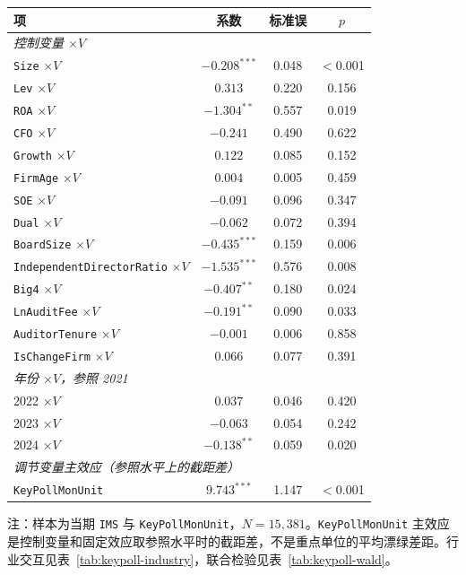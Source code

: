 \begin{center}
\begin{threeparttable}
\caption{完全交互的其他项：控制变量与年份}
\label{tab:keypoll-other}
\begin{tabular}{lccc}
\toprule
项 & 系数 & 标准误 & \(p\) \\
\midrule
\multicolumn{4}{l}{\textit{控制变量 $\times V$}} \\
\texttt{Size} $\times V$ & $-0.208^{***}$ & 0.048 & $<$0.001 \\
\texttt{Lev} $\times V$ & $0.313$ & 0.220 & 0.156 \\
\texttt{ROA} $\times V$ & $-1.304^{**}$ & 0.557 & 0.019 \\
\texttt{CFO} $\times V$ & $-0.241$ & 0.490 & 0.622 \\
\texttt{Growth} $\times V$ & $0.122$ & 0.085 & 0.152 \\
\texttt{FirmAge} $\times V$ & $0.004$ & 0.005 & 0.459 \\
\texttt{SOE} $\times V$ & $-0.091$ & 0.096 & 0.347 \\
\texttt{Dual} $\times V$ & $-0.062$ & 0.072 & 0.394 \\
\texttt{BoardSize} $\times V$ & $-0.435^{***}$ & 0.159 & 0.006 \\
\texttt{IndependentDirectorRatio} $\times V$ & $-1.535^{***}$ & 0.576 & 0.008 \\
\texttt{Big4} $\times V$ & $-0.407^{**}$ & 0.180 & 0.024 \\
\texttt{LnAuditFee} $\times V$ & $-0.191^{**}$ & 0.090 & 0.033 \\
\texttt{AuditorTenure} $\times V$ & $-0.001$ & 0.006 & 0.858 \\
\texttt{IsChangeFirm} $\times V$ & $0.066$ & 0.077 & 0.391 \\
\midrule
\multicolumn{4}{l}{\textit{年份 $\times V$，参照 2021}} \\
2022 $\times V$ & $0.037$ & 0.046 & 0.420 \\
2023 $\times V$ & $-0.063$ & 0.054 & 0.242 \\
2024 $\times V$ & $-0.138^{**}$ & 0.059 & 0.020 \\
\midrule
\multicolumn{4}{l}{\textit{调节变量主效应（参照水平上的截距差）}} \\
\texttt{KeyPollMonUnit} & $9.743^{***}$ & 1.147 & $<$0.001 \\
\bottomrule
\end{tabular}
\begin{tablenotes}\footnotesize
\item 注：样本为当期 \texttt{IMS} 与 \texttt{KeyPollMonUnit}，$N=15{,}381$。\texttt{KeyPollMonUnit} 主效应是控制变量和固定效应取参照水平时的截距差，不是重点单位的平均漂绿差距。行业交互见表~\ref{tab:keypoll-industry}，联合检验见表~\ref{tab:keypoll-wald}。
\end{tablenotes}
\end{threeparttable}
\end{center}

